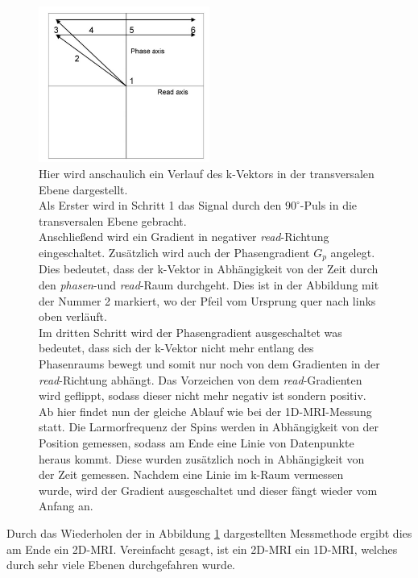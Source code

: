\begin{figure}[H]
    \centering
    \includegraphics[width = 0.5\textwidth]{Abbildungen/2DMRI.JPG}
    \caption[Veranschaulichter Verlauf des k-Vektors im 2D-MRI]{Hier wird anschaulich ein Verlauf des k-Vektors in der transversalen Ebene dargestellt.\\
    Als Erster wird in Schritt 1 das Signal durch den $90^{\circ}$-Puls in die transversalen Ebene gebracht.\\
    Anschließend wird ein Gradient in negativer \textit{read}-Richtung eingeschaltet. Zusätzlich wird auch der Phasengradient $G_p$ angelegt. Dies bedeutet, dass der k-Vektor in Abhängigkeit von der Zeit durch den \textit{phasen}-und \textit{read}-Raum durchgeht. Dies ist in der Abbildung mit der Nummer 2 markiert, wo der Pfeil vom Ursprung quer nach links oben verläuft.\\
    Im dritten Schritt wird der Phasengradient ausgeschaltet was bedeutet, dass sich der k-Vektor nicht mehr entlang des Phasenraums bewegt und somit nur noch von dem Gradienten in der \textit{read}-Richtung abhängt. Das Vorzeichen von dem \textit{read}-Gradienten wird geflippt, sodass dieser nicht mehr negativ ist sondern positiv. Ab hier findet nun der gleiche Ablauf wie bei der 1D-MRI-Messung statt. Die Larmorfrequenz der Spins werden in Abhängigkeit von der Position gemessen, sodass am Ende eine Linie von Datenpunkte heraus kommt. Diese wurden  zusätzlich noch in Abhängigkeit von der Zeit gemessen. Nachdem eine Linie im k-Raum vermessen wurde, wird der Gradient ausgeschaltet und dieser fängt wieder vom Anfang an.\cite{Schmidt}}
    \label{fig:2DMRIk}
\end{figure}
Durch das Wiederholen der in Abbildung \ref{fig:2DMRIk} dargestellten Messmethode ergibt dies am Ende ein 2D-MRI. Vereinfacht gesagt, ist ein 2D-MRI ein 1D-MRI, welches durch sehr viele Ebenen durchgefahren wurde.

